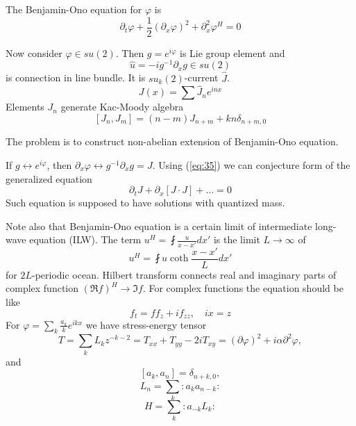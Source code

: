 \documentclass[12pt]{article}
\begin{document}
The Benjamin-Ono equation for $\varphi$ is
\begin{equation}
  \label{eq:35}
  \partial_{t} \varphi +\frac{1}{2} (\partial_{x}\varphi)^{2}+\partial_{x}^{2}\varphi^{H}=0
\end{equation}

Now consider $\varphi\in su(2)$. Then $g=e^{i\varphi}$ is Lie group element and
\begin{equation}
  \label{eq:32}
  \hat u=-ig^{-1} \partial_{x} g\in su(2)
\end{equation}
is connection in line bundle. It is $su_{k}(2)$-current $\hat J$.
\begin{equation}
  \label{eq:33}
  J(x)=\sum \hat J_{n} e^{inx}
\end{equation}
Elements $J_{n}$ generate Kac-Moody algebra
\begin{equation}
  \label{eq:34}
  [J_{n},J_{m}]=(n-m)J_{n+m} + k n \delta_{n+m,0}
\end{equation}

The problem is to construct non-abelian extension of Benjamin-Ono equation. 

If $g\leftrightarrow e^{i\varphi}$, then $\partial_{x}\varphi\leftrightarrow g^{-1}\partial_{x}g=J$.
Using (\ref{eq:35}) we can conjecture form of the generalized equation
\begin{equation}
  \label{eq:36}
  \partial_{t}J+\partial_{x}[J\cdot J]+\dots=0
\end{equation}
Such equation is supposed to have solutions with quantized mass. 

Note also that Benjamin-Ono equation is a certain limit of intermediate long-wave equation (ILW).
The term $u^{H}=\fint \frac{u}{x-x'}dx'$ is the limit $L\to\infty$ of
\begin{equation}
  \label{eq:37}
  u^{H}=\fint u \coth \frac{x-x'}{L} dx'
\end{equation}
for $2L$-periodic ocean. Hilbert transform connects real and imaginary parts of complex function
$(\Re f)^{H}\to \Im f$. For complex functions the equation should be like
\begin{equation}
  \label{eq:38}
  f_{t}=f f_{z}+if_{zz}, \quad ix=z
\end{equation}
For $\varphi=\sum_{k}\frac{a_{k}}{k} e^{ikx}$ we have stress-energy tensor
\begin{equation}
  \label{eq:39}
  T=\sum_{k}L_{k}z^{-k-2}=T_{xx}+T_{yy}-2i T_{xy}=(\partial \varphi)^{2} +i\alpha\partial^{2}\varphi,
\end{equation}
and
\begin{equation}
  \label{eq:40}
  [a_{k},a_{n}]=\delta_{n+k,0},
\end{equation}
\begin{equation}
  \label{eq:41}
  L_{n}=\sum_{k}:a_{k}a_{n-k}:
\end{equation}
\begin{equation}
  \label{eq:42}
  H=\sum_{k}:a_{-k}L_{k}:
\end{equation}
\end{document}

